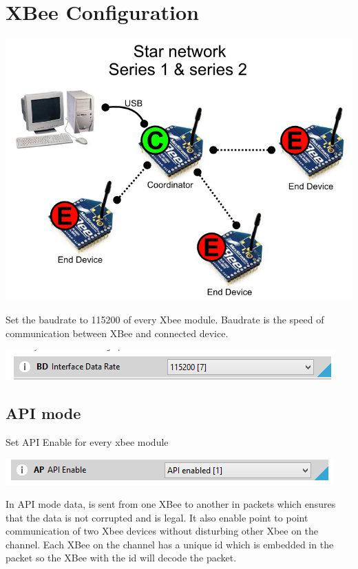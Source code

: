 \documentclass[main.tex]{subfiles}
\begin{document}
\pagebreak
\chapter[XBee Configuration]{XBee Configuration}

\begin{center}
	\includegraphics[scale = .447]{Images/star.png}
\end{center}

Set the baudrate to 115200 of every Xbee module.
Baudrate is the speed of communication between XBee and connected device.

\noindent\includegraphics[scale=1]{Images/baudrate.png}
\section{API mode}
Set API Enable for every xbee module

\includegraphics[scale=1]{Images/apienb.png}

In API mode data, is sent from one XBee to another in packets which ensures that the data is not corrupted and is legal. It also enable point to point communication of two Xbee devices without disturbing other Xbee on the channel.
Each XBee on the channel has a unique id which is embedded in the packet so the XBee with the id will decode the packet.
\end{document}
